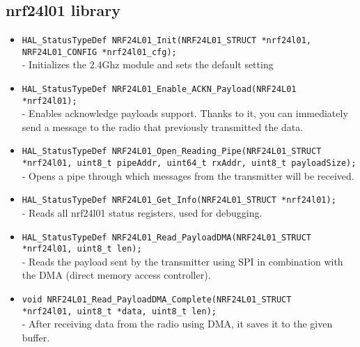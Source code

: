 \section{}

\dumblang
{


}
{
\subsection{nrf24l01 library}
\begin{itemize}
    \item \texttt{HAL\_StatusTypeDef NRF24L01\_Init(NRF24L01\_STRUCT *nrf24l01, \\
    NRF24L01\_CONFIG *nrf24l01\_cfg); }\\
    - Initializes the 2.4Ghz module and sets the default setting
    
    \item \texttt{HAL\_StatusTypeDef NRF24L01\_Enable\_ACKN\_Payload(NRF24L01 \\ *nrf24l01); } \\
    - Enables acknowledge payloads support. Thanks to it, you can immediately send a message to 
    the radio that previously transmitted the data.
    
    \item \texttt{HAL\_StatusTypeDef NRF24L01\_Open\_Reading\_Pipe(NRF24L01\_STRUCT *nrf24l01, uint8\_t pipeAddr, uint64\_t rxAddr, uint8\_t payloadSize);}\\
    - Opens a pipe through which messages from the transmitter will be received.

    \item \texttt{HAL\_StatusTypeDef NRF24L01\_Get\_Info(NRF24L01\_STRUCT *nrf24l01);} \\
    - Reads all nrf24l01 status registers, used for debugging.
    
    \item \texttt{HAL\_StatusTypeDef NRF24L01\_Read\_PayloadDMA(NRF24L01\_STRUCT \\ *nrf24l01, uint8\_t len);} \\
    - Reads the payload sent by the transmitter using SPI in combination with the DMA (direct memory access controller).
    
    \item \texttt{void NRF24L01\_Read\_PayloadDMA\_Complete(NRF24L01\_STRUCT \\ 
    *nrf24l01, uint8\_t *data, uint8\_t len);}\\
    - After receiving data from the radio using DMA, it saves it to the given buffer.
    

\end{itemize}}
